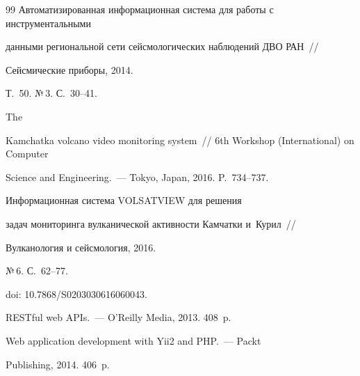 {{\begin{thebibliography}{99}
Автоматизированная информационная система для работы с инструментальными


 данными региональной сети сейсмологических наблюдений ДВО РАН~/\!\!/   


Сейсмические приборы, 2014.


Т.~50. №\,3. С.~30--41.


 







 The 


Kamchatka volcano video monitoring system~/\!\!/ 6th Workshop (International) on Computer 


Science and Engineering.~--- Tokyo, Japan, 2016. P.~734--737.






Информационная система VOLSATVIEW для решения 


задач мониторинга вулканической активности Камчатки и~Курил~/\!\!/


 Вулканология и сейсмология, 2016.


№\,6. С.~62--77.


 doi: 10.7868\!/\!S0203030616060043.


 




 RESTful web APIs.~--- O'Reilly Media, 2013. 408~p.







 Web application development with Yii2 and PHP.~--- Packt 


Publishing, 2014. 406~p.












\end{thebibliography}}}
